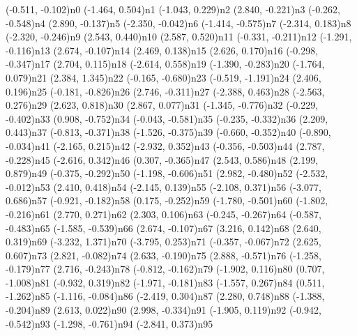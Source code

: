 \pnode(-0.511, -0.102){n0}
\pnode(-1.464, 0.504){n1}
\pnode(-1.043, 0.229){n2}
\pnode(2.840, -0.221){n3}
\pnode(-0.262, -0.548){n4}
\pnode(2.890, -0.137){n5}
\pnode(-2.350, -0.042){n6}
\pnode(-1.414, -0.575){n7}
\pnode(-2.314, 0.183){n8}
\pnode(-2.320, -0.246){n9}
\pnode(2.543, 0.440){n10}
\pnode(2.587, 0.520){n11}
\pnode(-0.331, -0.211){n12}
\pnode(-1.291, -0.116){n13}
\pnode(2.674, -0.107){n14}
\pnode(2.469, 0.138){n15}
\pnode(2.626, 0.170){n16}
\pnode(-0.298, -0.347){n17}
\pnode(2.704, 0.115){n18}
\pnode(-2.614, 0.558){n19}
\pnode(-1.390, -0.283){n20}
\pnode(-1.764, 0.079){n21}
\pnode(2.384, 1.345){n22}
\pnode(-0.165, -0.680){n23}
\pnode(-0.519, -1.191){n24}
\pnode(2.406, 0.196){n25}
\pnode(-0.181, -0.826){n26}
\pnode(2.746, -0.311){n27}
\pnode(-2.388, 0.463){n28}
\pnode(-2.563, 0.276){n29}
\pnode(2.623, 0.818){n30}
\pnode(2.867, 0.077){n31}
\pnode(-1.345, -0.776){n32}
\pnode(-0.229, -0.402){n33}
\pnode(0.908, -0.752){n34}
\pnode(-0.043, -0.581){n35}
\pnode(-0.235, -0.332){n36}
\pnode(2.209, 0.443){n37}
\pnode(-0.813, -0.371){n38}
\pnode(-1.526, -0.375){n39}
\pnode(-0.660, -0.352){n40}
\pnode(-0.890, -0.034){n41}
\pnode(-2.165, 0.215){n42}
\pnode(-2.932, 0.352){n43}
\pnode(-0.356, -0.503){n44}
\pnode(2.787, -0.228){n45}
\pnode(-2.616, 0.342){n46}
\pnode(0.307, -0.365){n47}
\pnode(2.543, 0.586){n48}
\pnode(2.199, 0.879){n49}
\pnode(-0.375, -0.292){n50}
\pnode(-1.198, -0.606){n51}
\pnode(2.982, -0.480){n52}
\pnode(-2.532, -0.012){n53}
\pnode(2.410, 0.418){n54}
\pnode(-2.145, 0.139){n55}
\pnode(-2.108, 0.371){n56}
\pnode(-3.077, 0.686){n57}
\pnode(-0.921, -0.182){n58}
\pnode(0.175, -0.252){n59}
\pnode(-1.780, -0.501){n60}
\pnode(-1.802, -0.216){n61}
\pnode(2.770, 0.271){n62}
\pnode(2.303, 0.106){n63}
\pnode(-0.245, -0.267){n64}
\pnode(-0.587, -0.483){n65}
\pnode(-1.585, -0.539){n66}
\pnode(2.674, -0.107){n67}
\pnode(3.216, 0.142){n68}
\pnode(2.640, 0.319){n69}
\pnode(-3.232, 1.371){n70}
\pnode(-3.795, 0.253){n71}
\pnode(-0.357, -0.067){n72}
\pnode(2.625, 0.607){n73}
\pnode(2.821, -0.082){n74}
\pnode(2.633, -0.190){n75}
\pnode(2.888, -0.571){n76}
\pnode(-1.258, -0.179){n77}
\pnode(2.716, -0.243){n78}
\pnode(-0.812, -0.162){n79}
\pnode(-1.902, 0.116){n80}
\pnode(0.707, -1.008){n81}
\pnode(-0.932, 0.319){n82}
\pnode(-1.971, -0.181){n83}
\pnode(-1.557, 0.267){n84}
\pnode(0.511, -1.262){n85}
\pnode(-1.116, -0.084){n86}
\pnode(-2.419, 0.304){n87}
\pnode(2.280, 0.748){n88}
\pnode(-1.388, -0.204){n89}
\pnode(2.613, 0.022){n90}
\pnode(2.998, -0.334){n91}
\pnode(-1.905, 0.119){n92}
\pnode(-0.942, -0.542){n93}
\pnode(-1.298, -0.761){n94}
\pnode(-2.841, 0.373){n95}
